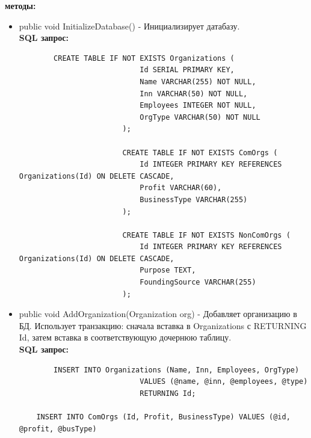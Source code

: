 \documentclass[oneside,a4paper,14pt]{extarticle}
\begin{document}
\textbf{методы:}
\begin{itemize}
    \item public void InitializeDatabase() - Инициализирует датабазу.\\
    \textbf{SQL запрос:}
    \begin{lstlisting}
        CREATE TABLE IF NOT EXISTS Organizations (
                            Id SERIAL PRIMARY KEY,
                            Name VARCHAR(255) NOT NULL,
                            Inn VARCHAR(50) NOT NULL,
                            Employees INTEGER NOT NULL,
                            OrgType VARCHAR(50) NOT NULL
                        );

                        CREATE TABLE IF NOT EXISTS ComOrgs (
                            Id INTEGER PRIMARY KEY REFERENCES Organizations(Id) ON DELETE CASCADE,
                            Profit VARCHAR(60),
                            BusinessType VARCHAR(255)
                        );

                        CREATE TABLE IF NOT EXISTS NonComOrgs (
                            Id INTEGER PRIMARY KEY REFERENCES Organizations(Id) ON DELETE CASCADE,
                            Purpose TEXT,
                            FoundingSource VARCHAR(255)
                        );
    \end{lstlisting}
    \item public void AddOrganization(Organization org) - Добавляет организацию в БД. Использует транзакцию: сначала вставка в Organizations с RETURNING Id, затем вставка в соответствующую дочернюю таблицу.\\
    \textbf{SQL запрос:}
    \begin{lstlisting}
        INSERT INTO Organizations (Name, Inn, Employees, OrgType)
                            VALUES (@name, @inn, @employees, @type)
                            RETURNING Id;

    INSERT INTO ComOrgs (Id, Profit, BusinessType) VALUES (@id, @profit, @busType)



\end{lstlisting}
\end{itemize}
\end{document}
